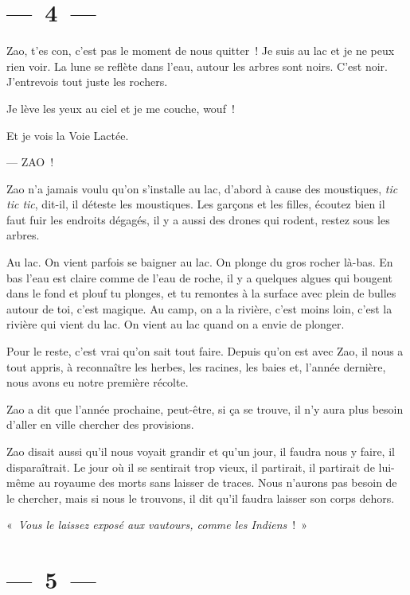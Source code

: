 \documentclass[french,twoside]{book} %
\begin{document}
\section[{— 4 —}]{— 4 —}
\renewcommand{\leftmark}{— 4 —}

\noindent Zao, t’es con, c’est pas le moment de nous quitter ! Je suis au lac et je ne peux rien voir. La lune se reflète dans l’eau, autour les arbres sont noirs. C’est noir. J’entrevois tout juste les rochers.\par
Je lève les yeux au ciel et je me couche, wouf !\par
Et je vois la Voie Lactée.\par
— ZAO !\par
\bigbreak
\noindent Zao n’a jamais voulu qu’on s’installe au lac, d’abord à cause des moustiques, \emph{tic tic tic}, dit-il, il déteste les moustiques. Les garçons et les filles, écoutez bien il faut fuir les endroits dégagés, il y a aussi des drones qui rodent, restez sous les arbres.\par
Au lac. On vient parfois se baigner au lac. On plonge du gros rocher là-bas. En bas l’eau est claire comme de l’eau de roche, il y a quelques algues qui bougent dans le fond et plouf tu plonges, et tu remontes à la surface avec plein de bulles autour de toi, c’est magique. Au camp, on a la rivière, c’est moins loin, c’est la rivière qui vient du lac. On vient au lac quand on a envie de plonger.\par
Pour le reste, c’est vrai qu’on sait tout faire. Depuis qu’on est avec Zao, il nous a tout appris, à reconnaître les herbes, les racines, les baies et, l’année dernière, nous avons eu notre première récolte.\par
Zao a dit que l’année prochaine, peut-être, si ça se trouve, il n’y aura plus besoin d’aller en ville chercher des provisions.\par
Zao disait aussi qu’il nous voyait grandir et qu’un jour, il faudra nous y faire, il disparaîtrait. Le jour où il se sentirait trop vieux, il partirait, il partirait de lui-même au royaume des morts sans laisser de traces. Nous n’aurons pas besoin de le chercher, mais si nous le trouvons, il dit qu’il faudra laisser son corps dehors.\par
« \emph{Vous le laissez exposé aux vautours, comme les Indiens} ! »

\section[{— 5 —}]{— 5 —}
\renewcommand{\leftmark}{— 5 —}
\end{document}
